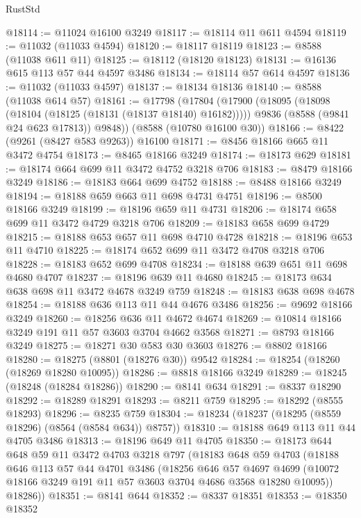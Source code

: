 \begin{lexlean}{RustStd}
\begin{coremodule}
@18114 := @11024 @16100 @3249
@18117 := @18114 @11 @611 @4594
@18119 := @11032 (@11033 @4594)
@18120 := @18117 @18119
@18123 := @8588 (@11038 @611 @11)
@18125 := @18112 (@18120 @18123)
@18131 := @16136 @615 @113 @57 @44 @4597 @3486
@18134 := @18114 @57 @614 @4597
@18136 := @11032 (@11033 @4597)
@18137 := @18134 @18136
@18140 := @8588 (@11038 @614 @57)
@18161 := @17798
    (@17804
      (@17900
        (@18095 (@18098 (@18104 (@18125 (@18131 (@18137 @18140) @16182)))))
        @9836
        (@8588 (@9841 @24 @623 @17813))
        @9848))
    (@8588 (@10780 @16100 @30))
@18166 := @8422 (@9261 (@8427 @583 @9263)) @16100
@18171 := @8456 @18166 @665 @11 @3472 @4754
@18173 := @8465 @18166 @3249
@18174 := @18173 @629
@18181 := @18174 @664 @699 @11 @3472 @4752 @3218 @706
@18183 := @8479 @18166 @3249
@18186 := @18183 @664 @699 @4752
@18188 := @8488 @18166 @3249
@18194 := @18188 @659 @663 @11 @698 @4731 @4751
@18196 := @8500 @18166 @3249
@18199 := @18196 @659 @11 @4731
@18206 := @18174 @658 @699 @11 @3472 @4729 @3218 @706
@18209 := @18183 @658 @699 @4729
@18215 := @18188 @653 @657 @11 @698 @4710 @4728
@18218 := @18196 @653 @11 @4710
@18225 := @18174 @652 @699 @11 @3472 @4708 @3218 @706
@18228 := @18183 @652 @699 @4708
@18234 := @18188 @639 @651 @11 @698 @4680 @4707
@18237 := @18196 @639 @11 @4680
@18245 := @18173 @634 @638 @698 @11 @3472 @4678 @3249 @759
@18248 := @18183 @638 @698 @4678
@18254 := @18188 @636 @113 @11 @44 @4676 @3486
@18256 := @9692 @18166 @3249
@18260 := @18256 @636 @11 @4672 @4674
@18269 := @10814 @18166 @3249 @191 @11 @57 @3603 @3704 @4662 @3568
@18271 := @8793 @18166 @3249
@18275 := @18271 @30 @583 @30 @3603
@18276 := @8802 @18166
@18280 := @18275 (@8801 (@18276 @30)) @9542
@18284 := @18254 (@18260 (@18269 @18280 @10095))
@18286 := @8818 @18166 @3249
@18289 := @18245 (@18248 (@18284 @18286))
@18290 := @8141 @634
@18291 := @8337 @18290
@18292 := @18289 @18291
@18293 := @8211 @759
@18295 := @18292 (@8555 @18293)
@18296 := @8235 @759
@18304 := @18234 (@18237 (@18295 (@8559 @18296) (@8564 (@8584 @634)) @8757))
@18310 := @18188 @649 @113 @11 @44 @4705 @3486
@18313 := @18196 @649 @11 @4705
@18350 := @18173
    @644
    @648
    @59
    @11
    @3472
    @4703
    @3218
    @797
    (@18183
      @648
      @59
      @4703
      (@18188
        @646
        @113
        @57
        @44
        @4701
        @3486
        (@18256
          @646
          @57
          @4697
          @4699
          (@10072 @18166 @3249 @191 @11 @57 @3603 @3704 @4686 @3568 @18280 @10095))
        @18286))
@18351 := @8141 @644
@18352 := @8337 @18351
@18353 := @18350 @18352

\end{coremodule}
\end{lexlean}
